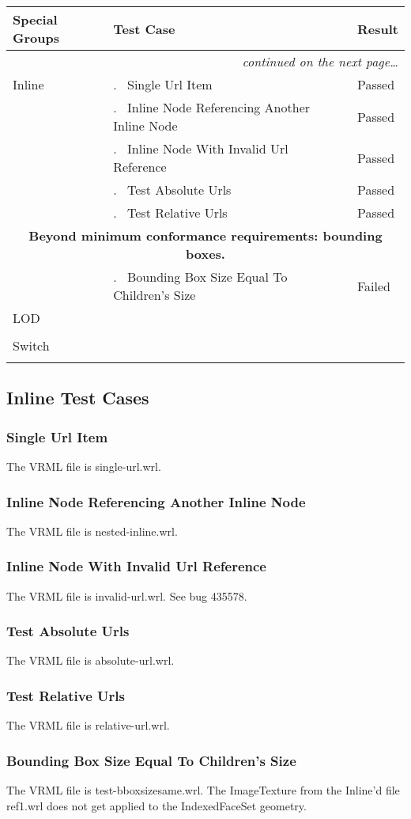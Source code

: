 \documentclass[12pt,letterpaper]{article}
\newcounter{testCaseCtr}
\newcommand{\testCase}{\arabic{testCaseCtr}.~ \stepcounter{testCaseCtr}}
\newcommand{\resetTestCase}{\setcounter{testCaseCtr}{1}}
\newcommand{\SpGrA}{Single Url Item}
\newcommand{\SpGrB}{Inline Node Referencing Another Inline Node}
\newcommand{\SpGrC}{Inline Node With Invalid Url Reference}
\newcommand{\SpGrD}{Test Absolute Urls}
\newcommand{\SpGrE}{Test Relative Urls}
\newcommand{\SpGrF}{Bounding Box Size Equal To Children's Size}
\begin{document}
\begin{center}
\setlongtables
\begin{longtable}{|l|l|l|}
\hline
\textbf{Special Groups} & \textbf{Test Case} & \textbf{Result} \\
\hline\hline
\endhead
 & \multicolumn{2}{|r|}{\textsl{continued on the next page\ldots}} \\
\hline
\endfoot
\hline
\endlastfoot
Inline & \testCase \SpGrA & Passed \\\cline{2-3}
& \testCase \SpGrB & Passed \\\cline{2-3}
& \testCase \SpGrC & Passed \\\cline{2-3}
& \testCase \SpGrD & Passed \\\cline{2-3}
& \testCase \SpGrE & Passed \\\hline
\multicolumn{3}{|c|}{\textbf{Beyond minimum conformance requirements:
bounding boxes.}} \\\hline
& \testCase \SpGrF & Failed \\\hline
\resetTestCase
LOD & & \\\cline{2-3}
& & \\\hline
\resetTestCase
Switch & & \\\cline{2-3}
& & \\
\end{longtable}
\end{center}

\subsection{Inline Test Cases}

\subsubsection{\SpGrA}
The VRML file is single-url.wrl.

\subsubsection{\SpGrB}
The VRML file is nested-inline.wrl.

\subsubsection{\SpGrC}
The VRML file is invalid-url.wrl.
See bug 435578.

\subsubsection{\SpGrD}
The VRML file is absolute-url.wrl.

\subsubsection{\SpGrE}
The VRML file is relative-url.wrl.

\subsubsection{\SpGrF}
The VRML file is test-bboxsizesame.wrl.\newline
The ImageTexture from the Inline'd file ref1.wrl does not get
applied to the IndexedFaceSet geometry.
\end{document}
